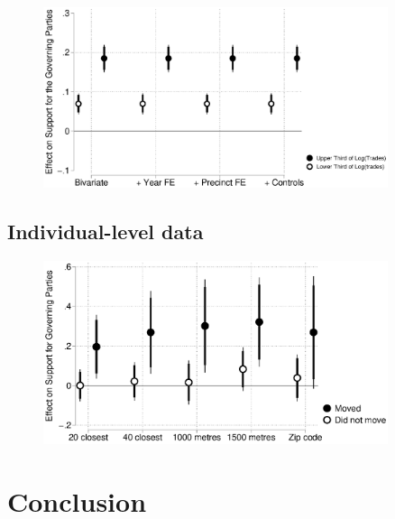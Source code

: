 \documentclass[10pt,aspectratio=169,handout]{beamer}
\begin{document}
\begin{frame} \centering
\begin{figure}[htbp!]
	\includegraphics[width=0.9\textwidth]{../../figures/localactivity.eps}
\end{figure}
\end{frame}

\subsection{Individual-level data}


\begin{frame} \centering
\begin{figure}[htbp!]
	\includegraphics[width=0.9\textwidth]{../../figures/moving.eps}
\end{figure}
\end{frame}



\section{Conclusion}
\end{document}
